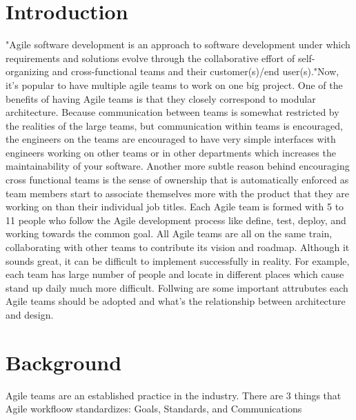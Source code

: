 \documentclass[sigplan,screen]{acmart}
\begin{document}
%

%
\maketitle

\section{Introduction}
"Agile software development is an approach to software development under which requirements and solutions evolve through the collaborative effort of self-organizing and cross-functional teams and their customer(s)/end user(s)."\cite{Wiki}Now, it's popular to have multiple agile teams to work on one big project. One of the benefits of having Agile teams is that they closely correspond to modular architecture. Because communication between teams is somewhat restricted by the realities of the large teams, but communication within teams is encouraged, the engineers on the teams are encouraged to have very simple interfaces with engineers working on other teams or in other departments which increases the maintainability of your software. Another more subtle reason behind encouraging cross functional teams is the sense of ownership that is automatically enforced as team members start to associate themselves more with the product that they are working on than their individual job titles.\cite{David} Each Agile team is formed with 5 to 11 people who follow the Agile development process like define, test, deploy, and working towards the common goal. All Agile teams are all on the same train, collaborating with other teams to contribute its vision and roadmap. Although it sounds great, it can be difficult to implement successfully in reality. For example, each team has large number of people and locate in different places which cause stand up daily much more difficult. Follwing are some important attrubutes each Agile teams should be adopted and what's the relationship between architecture and design.


\section{Background}
Agile teams are an established practice in the industry. There are 3 things that Agile workfloow standardizes: Goals, Standards, and Communications
\end{document}
